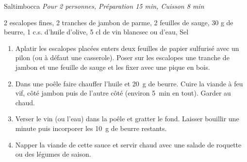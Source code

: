 \begin{recette}{Saltimbocca}
  \emph{Pour 2 personnes, Préparation 15 min, Cuisson 8 min}
	\begin{ingredients}
    2 escalopes fines\sep
    2 tranches de jambon de parme\sep
    2 feuilles de sauge\sep
    30 g de beurre\sep
    1 c.s. d’huile d’olive\sep
    5 cl de vin blancsec ou d’eau\sep
    Sel
	\end{ingredients}
	
	\begin{enumerate}
	\item Aplatir les escalopes placées enters deux feuilles de papier sulfurisé avec un pilon (ou à défaut une casserole). Poser sur les escalopes une tranche de jambon et une feuille de sauge et les fixer avec une pique en bois.
  \item Dans une poêle faire chauffer l’huile et 20~g de beurre. Cuire la viande à feu vif, côté jambon puis de l’autre côté (environ 5~min en tout). Garder au chaud.
  \item Verser le vin (ou l’eau) dans la poêle et gratter le fond. Laisser bouillir une minute puis incorporer les 10~g de beurre restants.
    \item Napper la viande de cette sauce et servir chaud avec une salade de roquette ou des légumes de saison.
	\end{enumerate}
\end{recette}
